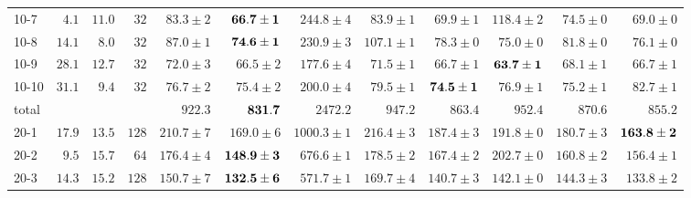 \documentclass[letterpaper]{article}
\newcommand{\G}{\cellcolor[gray]{0.75}}
\begin{document}
\begin{table}[t]
{\begin{minipage}{7.3in}
\begin{tabular}{l@{}rr@{}r rr rrr rrr}
      10-7  & $ 4.1$ & $11.0$ & $32$ &    $ 83.3\pm2$ &$\bf  66.7\pm1$ &    $244.8\pm4$ &    $ 83.9\pm1$ &    $ 69.9\pm1$ &    $118.4\pm2$ &    $ 74.5\pm0$ &\G  $ 69.0\pm0$ \\
      10-8  & $14.1$ & $ 8.0$ & $32$ &    $ 87.0\pm1$ &$\bf  74.6\pm1$ &    $230.9\pm3$ &    $107.1\pm1$ &    $ 78.3\pm0$ &\G  $ 75.0\pm0$ &    $ 81.8\pm0$ &    $ 76.1\pm0$ \\
      10-9  & $28.1$ & $12.7$ & $32$ &    $ 72.0\pm3$ &    $ 66.5\pm2$ &    $177.6\pm4$ &    $ 71.5\pm1$ &    $ 66.7\pm1$ &\G$\bf63.7\pm1$ &    $ 68.1\pm1$ &    $ 66.7\pm1$ \\
      10-10 & $31.1$ & $ 9.4$ & $32$ &    $ 76.7\pm2$ &    $ 75.4\pm2$ &    $200.0\pm4$ &    $ 79.5\pm1$ &\G$\bf74.5\pm1$ &    $ 76.9\pm1$ &    $ 75.2\pm1$ &    $ 82.7\pm1$ \\
      total &        &      &        &        $922.3$ &$\bf     831.7$ &       $2472.2$ &        $947.2$ &        $863.4$ &        $952.4$ &        $870.6$ &\G      $855.2$ \\
      \midrule
      20-1  & $17.9$ & $13.5$ & $128$&    $210.7\pm7$ &    $169.0\pm6$ &   $1000.3\pm1$ &    $216.4\pm3$ &    $187.4\pm3$ &    $191.8\pm0$ &    $180.7\pm3$ &\G$\bf163.8\pm2$\\
      20-2  & $ 9.5$ & $15.7$ & $64$ &    $176.4\pm4$ &$\bf 148.9\pm3$ &    $676.6\pm1$ &    $178.5\pm2$ &    $167.4\pm2$ &    $202.7\pm0$ &    $160.8\pm2$ &\G  $156.4\pm1$ \\
      20-3  & $14.3$ & $15.2$ & $128$&    $150.7\pm7$ &$\bf 132.5\pm6$ &    $571.7\pm1$ &    $169.7\pm4$ &    $140.7\pm3$ &    $142.1\pm0$ &    $144.3\pm3$ &\G  $133.8\pm2$ \\

\end{tabular}
\end{minipage}}
\end{table}
\end{document}
